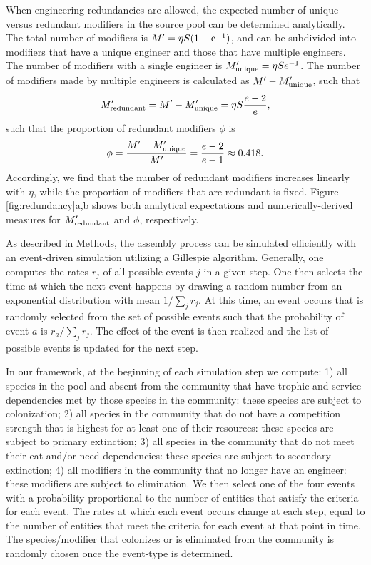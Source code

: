 \documentclass[twocolumn,preprintnumbers,amsmath,amssymb,superscriptaddress,linenumbers]{revtex4-1}
\newcommand{\rr}[1]{{\rm #1}}
\begin{document}
When engineering redundancies are allowed, the expected number of unique versus redundant modifiers in the source pool can be determined analytically.
The total number of modifiers is $M^\prime = \eta S (1 - \rr{e}^{-1})$, and can be subdivided into modifiers that have a unique engineer and those that have multiple engineers.
The number of modifiers with a single engineer is $M^\prime_{\rr{unique}} = \eta S e^{-1}$.
The number of modifiers made by multiple engineers is calculated as $M^\prime - M^\prime_{\rr{unique}}$, such that
\begin{equation}
M^\prime_{\rr{redundant}} =M^\prime - M^\prime_{\rr{unique}}= \eta S \frac{e - 2}{e},
\label{eq:redundant}
\end{equation}
such that the proportion of redundant modifiers $\phi$ is
\begin{equation}
\phi = \frac{M^\prime - M^\prime_{\rr{unique}}}{M^\prime} = \frac{e-2}{e-1} \approx 0.418.
\label{eq:redundantprop}
\end{equation}
Accordingly, we find that the number of redundant modifiers increases linearly with $\eta$, while the proportion of modifiers that are redundant is fixed.
Figure \ref{fig:redundancy}a,b shows both analytical expectations and numerically-derived measures for $M^\prime_{\rr{redundant}}$ and $\phi$, respectively.

As described in Methods, the assembly process can be simulated efficiently with an event-driven simulation utilizing a Gillespie algorithm.
Generally, one computes the rates $r_j$ of all possible events $j$ in a given step.
One then selects the time at which the next event happens by drawing a random number from an exponential distribution with mean $1/\sum_j{r_j}$.
At this time, an event occurs that is randomly selected from the set of possible events such that the probability of event $a$ is $r_a/\sum_j{r_j}$.
The effect of the event is then realized and the list of possible events is updated for the next step.

In our framework, at the beginning of each simulation step we compute:
1) all species in the pool and absent from the community that have trophic and service dependencies met by those species in the community: these species are subject to colonization;
2) all species in the community that do not have a competition strength that is highest for at least one of their resources: these species are subject to primary extinction;
3) all species in the community that do not meet their eat and/or need dependencies: these species are subject to secondary extinction;
4) all modifiers in the community that no longer have an engineer: these modifiers are subject to elimination.
We then select one of the four events with a probability proportional to the number of entities that satisfy the criteria for each event.
The rates at which each event occurs change at each step, equal to the number of entities that meet the criteria for each event at that point in time.
The species/modifier that colonizes or is eliminated from the community is randomly chosen once the event-type is determined.
\end{document}
